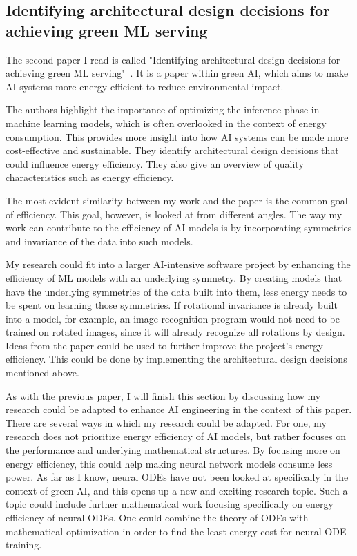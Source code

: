 \documentclass[11pt]{article}
\begin{document}
\subsection{Identifying architectural design decisions for achieving green ML
serving}

The second paper I read is called "Identifying architectural design decisions for achieving green ML serving"~\cite{Dur_n_2024}. It is a paper within green AI, which aims to make AI systems more energy efficient to reduce environmental impact. 

The authors highlight the importance of optimizing the inference phase in machine learning models, which is often overlooked in the context of energy consumption. This provides more insight into how AI systems can be made more cost-effective and sustainable. They identify architectural design decisions that could influence energy efficiency. They also give an overview of quality characteristics such as energy efficiency.


The most evident similarity between my work and the paper is the common goal of efficiency. This goal, however, is looked at from different angles. The way my work can contribute to the efficiency of AI models is by incorporating symmetries and invariance of the data into such models.




My research could fit into a larger AI-intensive software project by enhancing the efficiency of ML models with an underlying symmetry. By creating models that have the underlying symmetries of the data built into them, less energy needs to be spent on learning those symmetries. If rotational invariance is already built into a model, for example, an image recognition program would not need to be trained on rotated images, since it will already recognize all rotations by design. Ideas from the paper could be used to further improve the project's energy efficiency. This could be done by implementing the architectural design decisions mentioned above.




As with the previous paper, I will finish this section by discussing how my research could be adapted to enhance AI engineering in the context of this paper. There are several ways in which my research could be adapted. For one, my research does not prioritize energy efficiency of AI models, but rather focuses on the performance and underlying mathematical structures. By focusing more on energy efficiency, this could help making neural network models consume less power. As far as I know, neural ODEs have not been looked at specifically in the context of green AI, and this opens up a new and exciting research topic. Such a topic could include further mathematical work focusing specifically on energy efficiency of neural ODEs. One could combine the theory of ODEs with mathematical optimization in order to find the least energy cost for neural ODE training.



\end{document}
